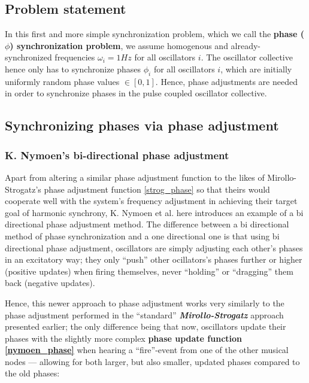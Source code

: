 	\subsection{Problem statement}

	In this first and more simple synchronization problem, which we call the \textbf{phase ($\phi$) synchronization problem}, we assume homogenous and already-synchronized frequencies $\omega_i=1Hz$ for all oscillators $i$. The oscillator collective hence only has to synchronize phases $\phi_i$ for all oscillators $i$, which are initially uniformly random phase values $\in [0,1]$. Hence, phase adjustments are needed in order to synchronize phases in the pulse coupled oscillator collective.

	
	\subsection{Synchronizing phases via phase adjustment}

		\subsubsection{K. Nymoen's bi-directional phase adjustment} %
		\label{subsec:nymoen_phase_adjust}

		Apart from altering a similar phase adjustment function to the likes of Mirollo-Strogatz's phase adjustment function \eqref{strog_phase} so that theirs would cooperate well with the system's frequency adjustment in achieving their target goal of harmonic synchrony, K. Nymoen et al. \cite{nymoen_synch} here introduces an example of a bi directional phase adjustment method. The difference between a bi directional method of phase synchronization and a one directional one is that using bi directional phase adjustment, oscillators are simply adjusting each other's phases in an excitatory way; they only ``push'' other ocillators's phases further or higher (positive updates) when firing themselves, never ``holding'' or ``dragging'' them back (negative updates).

		Hence, this newer approach to phase adjustment works very similarly to the phase adjustment performed in the ``standard'' \textbf{\textit{Mirollo-Strogatz}} approach presented earlier; the only difference being that now, oscillators update their phases with the slightly more complex \textbf{phase update function \eqref{nymoen_phase}} when hearing a ``fire''-event from one of the other musical nodes — allowing for both larger, but also smaller, updated phases compared to the old phases:

